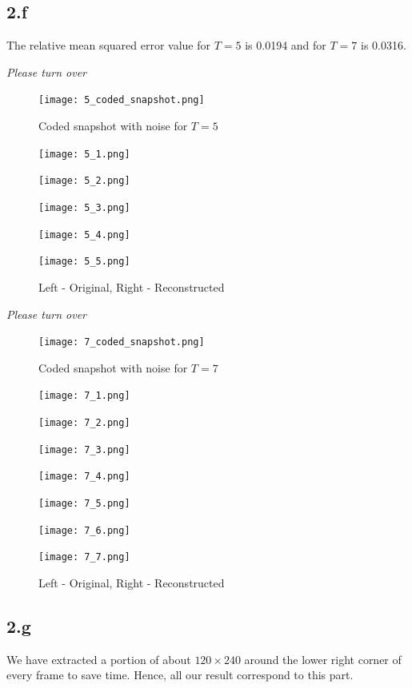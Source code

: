 \documentclass[12pt]{article}
\begin{document}
\subsection*{2.f}
The relative mean squared error value for $T = 5$ is 0.0194 and for $T = 7$ is 0.0316.
\vspace{2cm}
\begin{center}
\textit{Please turn over}
\end{center}
\newpage
\begin{figure}[ht]
	\centering
	\texttt{[image: 5\_coded\_snapshot.png]}
	\caption{Coded snapshot with noise for $T = 5$}
\end{figure}
\begin{figure}[ht]
	\centering
	\begin{minipage}[bt]{0.4\linewidth}
		\centering
			\texttt{[image: 5\_1.png]}
			\caption{$t = 1$}
			\texttt{[image: 5\_2.png]}
			\caption{$t = 2$}
			\texttt{[image: 5\_3.png]}
			\caption{$t = 3$}
	\end{minipage}
\begin{minipage}[bt]{0.5\linewidth}
\centering
	\texttt{[image: 5\_4.png]}
	\caption{$t = 4$}
	\texttt{[image: 5\_5.png]}
	\caption{$t = 5$}
\end{minipage}
\caption{Left - Original, Right - Reconstructed}
\end{figure}
\vspace{3cm}
\begin{center}
	\textit{Please turn over}
\end{center}
\newpage
\begin{figure}[ht]
	\centering
	\texttt{[image: 7\_coded\_snapshot.png]}
	\caption{Coded snapshot with noise for $T = 7$}
\end{figure}
\begin{figure}[ht]
\centering
\begin{minipage}[bt]{0.4\linewidth}
	\centering
	\texttt{[image: 7\_1.png]}
	\caption{$t = 1$}
	\texttt{[image: 7\_2.png]}
	\caption{$t = 2$}
	\texttt{[image: 7\_3.png]}
	\caption{$t = 3$}
	\texttt{[image: 7\_4.png]}
	\caption{$t = 4$}
\end{minipage}
\begin{minipage}[bt]{0.5\linewidth}
	\centering
	\texttt{[image: 7\_5.png]}
	\caption{$t = 5$}
	\texttt{[image: 7\_6.png]}
	\caption{$t = 6$}
	\texttt{[image: 7\_7.png]}
	\caption{$t = 7$}
\end{minipage}
\caption{Left - Original, Right - Reconstructed}
\end{figure}
\subsection*{2.g}
We have extracted a portion of about $120 \times 240$ around the lower right corner of every frame to save time. Hence, all our result correspond to this part. 
\newpage
\end{document}
